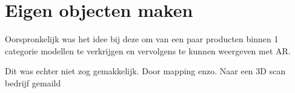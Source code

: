 
\chapter{Eigen objecten maken}
\label{ch:eigen-objecten-maken}

Oorspronkelijk was het idee bij deze om van een paar producten binnen 1 categorie modellen te verkrijgen en vervolgens te kunnen weergeven met AR. 

Dit was echter niet zog gemakkelijk. Door mapping enzo.
Naar een 3D scan bedrijf gemaild 